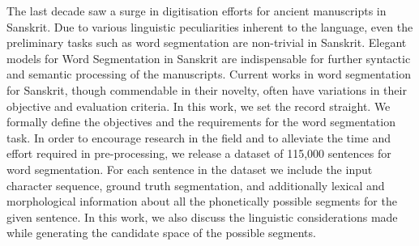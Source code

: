 The last decade saw a surge in digitisation efforts for ancient manuscripts in Sanskrit. Due to various linguistic peculiarities inherent to the language, even the preliminary tasks such as word segmentation are non-trivial in Sanskrit. Elegant models for Word Segmentation in Sanskrit are indispensable for further syntactic and semantic processing of the manuscripts. Current works in word segmentation for Sanskrit, though commendable in their novelty, often have variations in their objective and evaluation criteria. In this work, we set the record straight. We formally define the objectives and the requirements for the word segmentation task. In order to encourage research in the field and to alleviate the time and effort required in pre-processing, we release a dataset of 115,000 sentences for word segmentation. For each sentence in the dataset we include the input character sequence, ground truth segmentation, and additionally lexical and morphological information about all the phonetically possible segments for the given sentence. In this work, we also discuss the linguistic considerations made while generating the candidate space of the possible segments.
